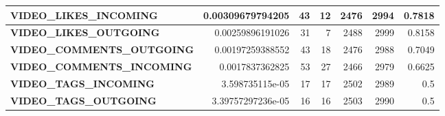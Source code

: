 \begin{table}
\begin{tabular}{| >{\small}l | >{\small}r | >{\small}r | >{\small}r | >{\small}r | >{\small}r | >{\small}r |}
	\hline
	\textbf{VIDEO\_LIKES\_INCOMING}& 0.00309679794205 & 43 & 12 & 2476 & 2994 & 0.7818\\
	\hline
	\textbf{VIDEO\_LIKES\_OUTGOING}& 0.00259896191026 & 31 & 7 & 2488 & 2999 & 0.8158\\
	\hline
	\textbf{VIDEO\_COMMENTS\_OUTGOING}& 0.00197259388552 & 43 & 18 & 2476 & 2988 & 0.7049\\
	\hline
	\textbf{VIDEO\_COMMENTS\_INCOMING}& 0.0017837362825 & 53 & 27 & 2466 & 2979 & 0.6625\\
	\hline
	\textbf{VIDEO\_TAGS\_INCOMING}& 3.598735115e-05 & 17 & 17 & 2502 & 2989 & 0.5 \\
	\hline
	\textbf{VIDEO\_TAGS\_OUTGOING}& 3.39757297236e-05 & 16 & 16 & 2503 & 2990 & 0.5\\
	\hline
	\end{tabular}
\end{table}

\cleardoublepage

